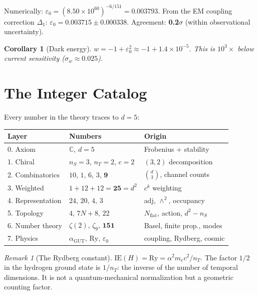 \documentclass[12pt]{article}
\newtheorem{corollary}[theorem]{Corollary}
\theoremstyle{definition}
\theoremstyle{remark}
\newtheorem{remark}[theorem]{Remark}
\newcommand{\CC}{\mathbb{C}}
\newcommand{\agut}{\alpha_{\mathrm{GUT}}}
\begin{document}
Numerically: $\varepsilon_0 = (8.50\times10^{60})^{-6/151} = 0.003793$.
From the EM coupling correction $\Delta_1$: $\varepsilon_0 = 0.003715 \pm 0.000338$.
Agreement: \textbf{0.2$\sigma$} (within observational uncertainty).

\begin{corollary}[Dark energy]
$w = -1 + \varepsilon_0^2 \approx -1 + 1.4\times10^{-5}$.
This is $10^3\times$ below current sensitivity ($\sigma_w \approx 0.025$).
\end{corollary}

\section{The Integer Catalog}
\label{sec:catalog}

Every number in the theory traces to $d=5$:

\begin{center}
\begin{tabular}{lll}
\toprule
\textbf{Layer} & \textbf{Numbers} & \textbf{Origin} \\
\midrule
0. Axiom & $\CC$, $d=5$ & Frobenius + stability \\
1. Chiral & $n_S\!=\!3$, $n_T\!=\!2$, $c\!=\!2$ & $(3,2)$ decomposition \\
2. Combinatorics & $10,\,1,\,6,\,3,\,\mathbf{9}$ & $\binom{d}{3}$, channel counts \\
3. Weighted & $1\!+\!12\!+\!12 = \mathbf{25} = d^2$ & $c^k$ weighting \\
4. Representation & $24,\,20,\,4,\,3$ & adj, $\wedge^2$, occupancy \\
5. Topology & $4,\,7N\!+\!8,\,22$ & $N_{\text{flat}}$, action, $d^2\!-\!n_S$ \\
6. Number theory & $\zeta(2),\,\zeta_9,\,\mathbf{151}$ & Basel, finite prop., modes \\
7. Physics & $\agut,\,\mathrm{Ry},\,\varepsilon_0$ & coupling, Rydberg, cosmic \\
\bottomrule
\end{tabular}
\end{center}

\begin{remark}[The Rydberg constant]
$\mathrm{IE}(H) = \mathrm{Ry} = \alpha^2 m_e c^2 / n_T$.
The factor $1/2$ in the hydrogen ground state is $1/n_T$: the inverse
of the number of temporal dimensions. It is not a quantum-mechanical
normalization but a geometric counting factor.
\end{remark}
\end{document}
